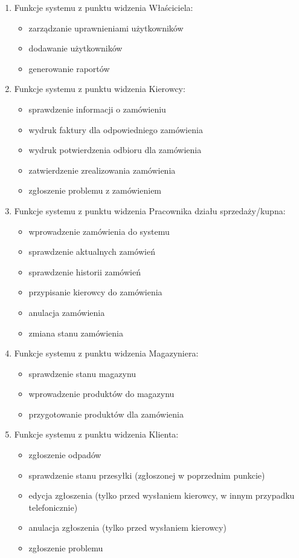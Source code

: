 
\begin{enumerate}
\item Funkcje systemu z punktu widzenia Właściciela:
	\begin{itemize}
		\item zarządzanie uprawnieniami użytkowników
		\item dodawanie użytkowników
		\item generowanie raportów
	\end{itemize}

\item Funkcje systemu z punktu widzenia Kierowcy:
	\begin{itemize}
		\item sprawdzenie informacji o zamówieniu
		\item wydruk faktury dla odpowiedniego zamówienia
		\item wydruk potwierdzenia odbioru dla zamówienia
		\item zatwierdzenie zrealizowania zamówienia
		\item zgłoszenie problemu z zamówieniem
	\end{itemize}

\item Funkcje systemu z punktu widzenia Pracownika działu sprzedaży/kupna:
	\begin{itemize}
		\item wprowadzenie zamówienia do systemu
		\item sprawdzenie aktualnych zamówień
		\item sprawdzenie historii zamówień
		\item przypisanie kierowcy do zamówienia
		\item anulacja zamówienia
		\item zmiana stanu zamówienia
	\end{itemize}

\item Funkcje systemu z punktu widzenia Magazyniera:
	\begin{itemize}
		\item sprawdzenie stanu magazynu 
		\item wprowadzenie produktów do magazynu
		\item przygotowanie produktów dla zamówienia
	\end{itemize}

\item Funkcje systemu z punktu widzenia Klienta:
	\begin{itemize}
		\item zgłoszenie odpadów
		\item sprawdzenie stanu przesyłki (zgłoszonej w poprzednim punkcie)
		\item edycja zgłoszenia (tylko przed wysłaniem kierowcy, w innym przypadku telefonicznie)
		\item anulacja zgłoszenia (tylko przed wysłaniem kierowcy)
		\item zgłoszenie problemu
	\end{itemize}


\end{enumerate}
